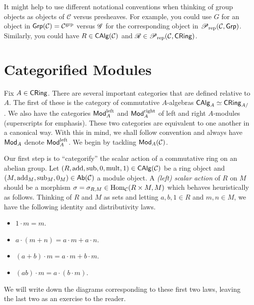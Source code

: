 \documentclass[11pt]{article}
\renewcommand{\C}{\mathcal{C}}
\DeclareMathOperator{\add}{add} %
\DeclareMathOperator{\lleft}{left} %
\DeclareMathOperator{\mult}{mult} %
\DeclareMathOperator{\rright}{right} %
\DeclareMathOperator{\sub}{sub} %
\begin{document}
\begin{remark}
It might help to use different notational conventions when thinking of group objects as objects of $\C$ versus presheaves. For example, you could use $G$ for an object in $\Grp(\C)=\C^{\grp}$ versus $\mathscr{G}$ for the corresponding object in $\Pre_{\rep}(\C,\Grp)$. Similarly, you could have $R\in\CAlg(\C)$ and $\ms{R}\in\Pre_{\rep}(\C,\CRing)$.
\end{remark}

\section{Categorified Modules}
Fix $A\in\operatorname{\mathsf{CRing}}$. There are several important categories that are defined relative to $A$. The first of these is the category of commutative $A$-algebras $\operatorname{\mathsf{CAlg}}_A\simeq\operatorname{\mathsf{CRing}}_{A/}$. We also have the categories $\Mod_A^{\lleft}$ and $\Mod_A^{\rright}$ of left and right $A$-modules (superscripts for emphasis). These two categories are equivalent to one another in a canonical way. With this in mind, we shall follow convention and always have $\operatorname{\mathsf{Mod}}_A$ denote $\Mod_A^{\lleft}$. We begin by tackling $\Mod_A(\C)$.

Our first step is to ``categorify'' the scalar action of a commutative ring on an abelian group. Let $(R,\add,\sub,0,\mult,1)\in\CAlg(\C)$ be a ring object and $(M,\add_M,\sub_M,0_M)\in\Ab(\C)$ a module object. A \emph{(left) scalar action} of $R$ on $M$ should be a morphism $\sigma=\sigma_{R,M}\in\Hom_{\C}(R\times M,M)$ which behaves heuristically as follows. Thinking of $R$ and $M$ as sets and letting $a,b,1\in R$ and $m,n\in M$, we have the following identity and distributivity laws.
\begin{itemize}
\item $1\cdot m=m$.

\item $a\cdot(m+n)=a\cdot m+a\cdot n$.

\item $(a+b)\cdot m=a\cdot m+b\cdot m$.

\item $(ab)\cdot m=a\cdot(b\cdot m)$.
\end{itemize}

We will write down the diagrams corresponding to these first two laws, leaving the last two as an exercise to the reader.
\end{document}
